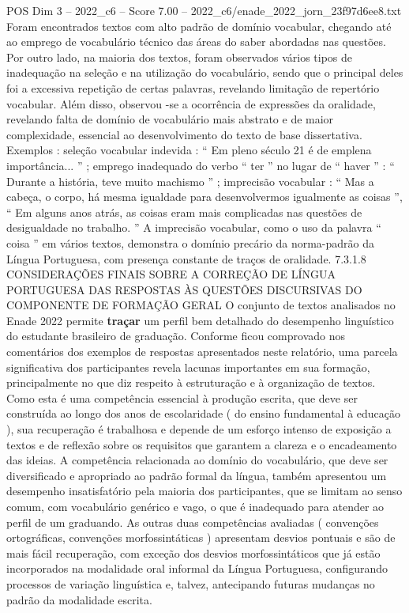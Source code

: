 \begin{textsample}{POS Dim 3 – 2022\_c6 – Score 7.00 – 2022\_c6/enade\_2022\_jorn\_23f97d6ee8.txt}
Foram encontrados textos com alto padrão de domínio vocabular, chegando até ao emprego de vocabulário técnico das áreas do saber abordadas nas questões.
Por outro lado, na maioria dos textos, foram observados vários tipos de inadequação na seleção e na utilização do vocabulário, sendo que o principal deles foi a excessiva repetição de certas palavras, revelando limitação de repertório vocabular.
Além disso, observou -se a ocorrência de expressões da oralidade, revelando falta de domínio de vocabulário mais abstrato e de maior complexidade, essencial ao desenvolvimento do texto de base dissertativa.
Exemplos : seleção vocabular indevida : “ Em pleno século 21 é de emplena importância... ” ; emprego inadequado do verbo “ ter ” no lugar de “ haver ” : “ Durante a história, teve muito machismo ” ; imprecisão vocabular : “ Mas a cabeça, o corpo, há mesma igualdade para desenvolvermos igualmente as coisas ”, “ Em alguns anos atrás, as coisas eram mais complicadas nas questões de desigualdade no trabalho. ” A imprecisão vocabular, como o uso da palavra “ coisa ” em vários textos, demonstra o domínio precário da norma-padrão da Língua Portuguesa, com presença constante de traços de oralidade. 7.3.1.8 CONSIDERAÇÕES FINAIS SOBRE A CORREÇÃO DE LÍNGUA PORTUGUESA DAS RESPOSTAS ÀS QUESTÕES DISCURSIVAS DO COMPONENTE DE FORMAÇÃO GERAL O conjunto de textos analisados no Enade 2022 permite \textbf{traçar} um perfil bem detalhado do desempenho linguístico do estudante brasileiro de graduação.
Conforme ficou comprovado nos comentários dos exemplos de respostas apresentados neste relatório, uma parcela significativa dos participantes revela lacunas importantes em sua formação, principalmente no que diz respeito à estruturação e à organização de textos.
Como esta é uma competência essencial à produção escrita, que deve ser construída ao longo dos anos de escolaridade ( do ensino fundamental à educação ), sua recuperação é trabalhosa e depende de um esforço intenso de exposição a textos e de reflexão sobre os requisitos que garantem a clareza e o encadeamento das ideias.
A competência relacionada ao domínio do vocabulário, que deve ser diversificado e apropriado ao padrão formal da língua, também apresentou um desempenho insatisfatório pela maioria dos participantes, que se limitam ao senso comum, com vocabulário genérico e vago, o que é inadequado para atender ao perfil de um graduando.
As outras duas competências avaliadas ( convenções ortográficas, convenções morfossintáticas ) apresentam desvios pontuais e são de mais fácil recuperação, com exceção dos desvios morfossintáticos que já estão incorporados na modalidade oral informal da Língua Portuguesa, configurando processos de variação linguística e, talvez, antecipando futuras mudanças no padrão da modalidade escrita.

\end{textsample}
